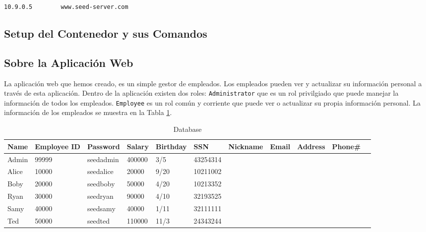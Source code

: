 \begin{lstlisting}
10.9.0.5        www.seed-server.com
\end{lstlisting}
 

\subsection{Setup del Contenedor y sus Comandos}








\subsection{Sobre la Aplicación Web} 

La aplicación web que hemos creado, es un simple gestor de empleados.
Los empleados pueden ver y actualizar su información personal a través de esta aplicación.
Dentro de la aplicación existen dos roles:
{\tt Administrator} que es un rol privilgiado que puede manejar la información de todos los empleados.
{\tt Employee} es un rol común y corriente que puede ver o actualizar su propia información personal. La información de los empleados se muestra en la Tabla
\ref{table:database}.

\begin{table}[htb]
\caption{Database}
\label{table:database}
\centering
\begin{adjustbox}{max width=\textwidth}
\begin{tabular}{|l|l|l|l|l|l|l|l|l|l|l|}
\hline
Name & Employee ID  & Password  &Salary  &Birthday  &SSN &Nickname &Email &Address &Phone\# \\
\hline
Admin 	& 99999       & seedadmin  &400000  &3/5   &43254314	& & & &\\
Alice 	& 10000       & seedalice  &20000   &9/20  &10211002	& & & &\\
Boby 	& 20000       & seedboby   &50000   &4/20  &10213352	& & & &\\
Ryan    & 30000       & seedryan   &90000   &4/10  &32193525	& & & &\\
Samy 	& 40000	      & seedsamy   &40000   &1/11  &32111111 	& & & &\\
Ted     & 50000	      & seedted    &110000  &11/3  &24343244	& & & &\\
\hline
\end{tabular}
\end{adjustbox}
\end{table}
 



